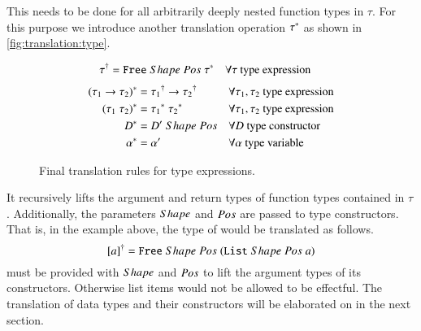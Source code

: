 This needs to be done for all arbitrarily deeply nested function types in $\tau$.
For this purpose we introduce another translation operation ${\tau}^{*}$ as shown in \autoref{fig:translation:type}.
\begin{figure}[H]
  \begin{align}
       {\tau}^{\dagger}
    &= {\texttt{Free}}\;Shape\;Pos\;{{\tau}^{*}}
    && \forall \tau \text{ type expression}
       \label{eqn:translation:type}
  \end{align}
  \begin{align}
       {(\tau_1 \rightarrow \tau_2)}^{*}
    &= {\tau_1}^{\dagger} \rightarrow {\tau_2}^{\dagger}
    && \forall \tau_1, \tau_2 \text{ type expression}
       \label{eqn:translation:type:function}
    \\
       {(\tau_1\;\tau_2)}^{*}
    &= {\tau_1}^{*}\;{\tau_2}^{*}
    && \forall \tau_1, \tau_2 \text{ type expression}
       \label{eqn:translation:type:application}
    \\
       {D}^{*}
    &= {D'}\;Shape\;Pos
    && \forall D \text{ type constructor}
       \label{eqn:translation:type:constructor}
    \\
    {\alpha}^{*}
    &= \alpha'
    && \forall \alpha \text{ type variable}
       \label{eqn:translation:type:variable}
  \end{align}
  \caption{Final translation rules for type expressions.}
  \label{fig:translation:type}
\end{figure}

It recursively lifts the argument and return types of function types contained in $\tau$.
Additionally, the parameters $Shape$ and $Pos$ are passed to type constructors.
That is, in the example above, the type of  would be translated as follows.
\[
  {[a]}^{\dagger} = {\texttt{Free}}\;Shape\;Pos\;{({\texttt{List}}\;Shape\;Pos\;a)}
\]
 must be provided with $Shape$ and $Pos$ to lift the argument types of its constructors.
Otherwise list items would not be allowed to be effectful.
The translation of data types and their constructors will be elaborated on in the next section.
